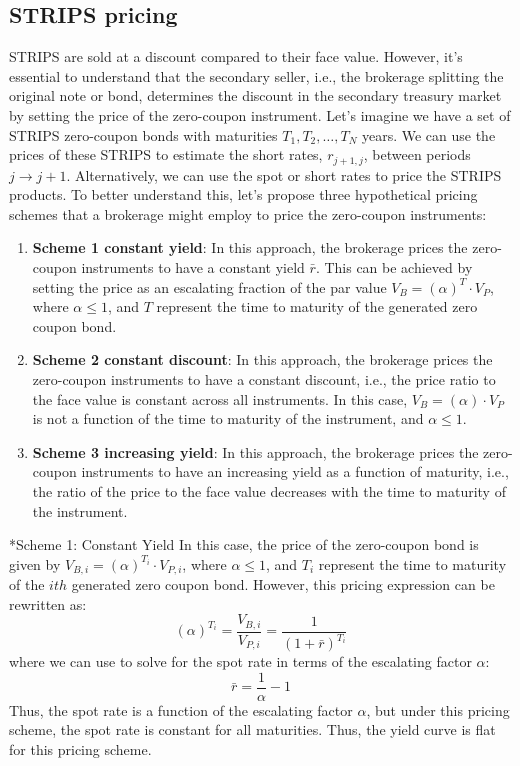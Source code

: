 \documentclass[11pt]{article}
\makeatletter
\theoremstyle{definition}
\renewcommand\subsubsection{\@startsection
	{subsubsection}{2}{0mm}
	{-0.05in}
	{-0.5\baselineskip}
	{\normalfont\normalsize\itshape\bfseries}}
\makeatother
\begin{document}
\subsection{STRIPS pricing}
STRIPS are sold at a discount compared to their face value. However, it's essential to understand that the secondary seller, i.e., the brokerage splitting the original note or bond, determines the discount in the secondary treasury market by setting the price of the zero-coupon instrument. Let's imagine we have a set of STRIPS zero-coupon bonds with maturities $T_{1}, T_{2},\ldots, T_{N}$ years. 
We can use the prices of these STRIPS to estimate the short rates, $r_{j+1,j}$, between periods $j\rightarrow{j+1}$.
Alternatively, we can use the spot or short rates to price the STRIPS products. 
To better understand this, let's propose three hypothetical pricing schemes that a brokerage might employ to price the zero-coupon instruments:
\begin{enumerate}
\item{\textbf{Scheme 1 constant yield}: In this approach, the brokerage prices the zero-coupon instruments to have a constant yield $\bar{r}$. This can be achieved by setting the price as an escalating fraction of the par value $V_{B} = \left(\alpha\right)^{T}\cdot{V}_{P}$, where $\alpha\leq{1}$, and $T$ represent the time to maturity of the generated zero coupon bond.}
\item{\textbf{Scheme 2 constant discount}: In this approach, the brokerage prices the zero-coupon instruments to have a constant discount, i.e., the price ratio to the face value is constant across all instruments. In this case, $V_{B} = \left(\alpha\right)\cdot{V}_{P}$ is not a function of the time to maturity of the instrument, and $\alpha\leq{1}$.}
\item{\textbf{Scheme 3 increasing yield}: In this approach, the brokerage prices the zero-coupon instruments to have an increasing yield as a function of maturity, i.e., the ratio of the price to the face value decreases with the time to maturity of the instrument.}
\end{enumerate}

\subsubsection*{Scheme 1: Constant Yield}
In this case, the price of the zero-coupon bond is given by $V_{B, i} = \left(\alpha\right)^{T_{i}}\cdot{V}_{P, i}$, where $\alpha\leq{1}$, and $T_{i}$ represent the time to maturity of the $ith$ generated zero coupon bond. However, this pricing expression can be rewritten as:
\begin{equation}
\left(\alpha\right)^{T_{i}} = \frac{V_{B,i}}{V_{P,i}} = \frac{1}{\left(1+\bar{r}\right)^{T_{i}}}
\end{equation}
where we can use to solve for the spot rate in terms of the escalating factor $\alpha$:
\begin{equation}
\bar{r} = \frac{1}{\alpha} - 1
\end{equation}
Thus, the spot rate is a function of the escalating factor $\alpha$, but under this pricing scheme, 
the spot rate is constant for all maturities. Thus, the yield curve is flat for this pricing scheme.
\end{document}
